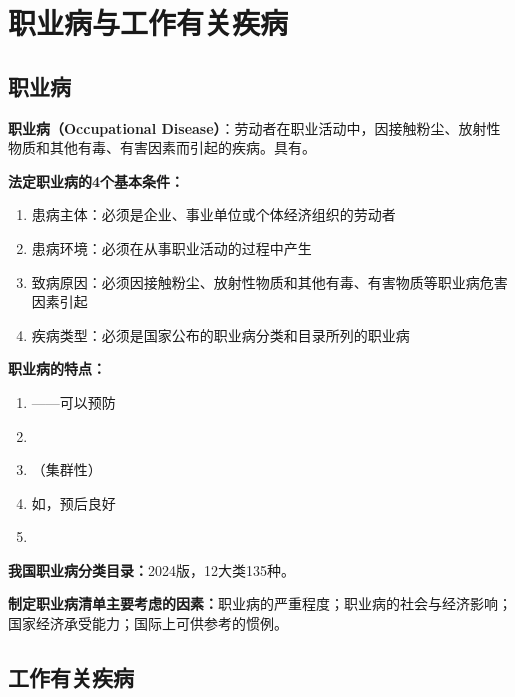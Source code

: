 \section{职业病与工作有关疾病}

\subsection{职业病}

\begin{defbox}
\textbf{职业病（Occupational Disease）}：劳动者在职业活动中，因接触粉尘、放射性物质和其他有毒、有害因素而引起的疾病。具有。

\textbf{法定职业病的4个基本条件：}
\begin{enumerate}[leftmargin=*]
    \item 患病主体：必须是企业、事业单位或个体经济组织的劳动者
    \item 患病环境：必须在从事职业活动的过程中产生
    \item 致病原因：必须因接触粉尘、放射性物质和其他有毒、有害物质等职业病危害因素引起
    \item 疾病类型：必须是国家公布的职业病分类和目录所列的职业病
\end{enumerate}
\end{defbox}

\begin{keybox}
\textbf{职业病的特点：}
\begin{enumerate}[leftmargin=*]
    \item {}——可以预防
    \item {}
    \item {}（集群性）
    \item 如，预后良好
    \item {}
\end{enumerate}

\textbf{我国职业病分类目录：}2024版，12大类135种。

\textbf{制定职业病清单主要考虑的因素：}职业病的严重程度；职业病的社会与经济影响；国家经济承受能力；国际上可供参考的惯例。
\end{keybox}

\subsection{工作有关疾病}


